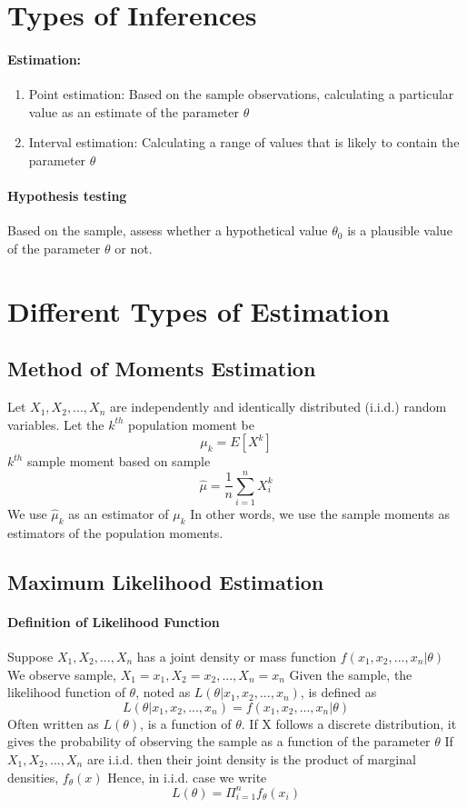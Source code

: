 \documentclass[11pt]{article}
\begin{document}
\section{Types of Inferences}
\paragraph{Estimation:}
\begin{enumerate}
	\item Point estimation: Based on the sample observations, calculating a particular value as an estimate of the parameter $\theta$
	\item Interval estimation: Calculating a range of values that is likely to contain the parameter $\theta$
\end{enumerate}
\paragraph{Hypothesis testing} Based on the sample, assess whether a hypothetical value $\theta_0$ is a plausible value of the parameter $\theta$ or not.
\section{Different Types of Estimation}
\subsection{Method of Moments Estimation}
Let $X_1, X_2, ..., X_n$ are independently and identically distributed (i.i.d.) random variables. \newline
Let the $k^{th}$ population moment be
$$\mu_k = E[X^k]$$
$k^{th}$ sample moment based on sample
$$\hat{\mu} = \frac{1}{n}\sum_{i=1}^{n}X^k_i$$
We use $\hat{\mu}_k$ as an estimator of $\mu_k$ \newline
In other words, we use the sample moments as estimators of the population moments.
\subsection{Maximum Likelihood Estimation}
\paragraph{Definition of Likelihood Function}
Suppose $X_1, X_2,...,X_n$ has a joint density or mass function $f(x_1, x_2,...,x_n|\theta)$ \newline
We observe sample, $X_1 = x_1, X_2 = x_2, ..., X_n = x_n$ \newline
Given the sample, the likelihood function of $\theta$, noted as $L(\theta|x_1, x_2,...,x_n)$, is defined as
$$L(\theta|x_1, x_2,...,x_n) = f(x_1, x_2,...,x_n|\theta)$$
Often written as $L(\theta)$, is a function of $\theta$. \newline
If X follows a discrete distribution, it gives the probability of observing the sample as a function of the parameter $\theta$ \newline
If $X_1, X_2,...,X_n$ are i.i.d. then their joint density is the product of marginal densities, $f_\theta(x)$\newline
Hence, in i.i.d. case we write
$$L(\theta) = \Pi_{i=1}^n f_\theta(x_i)$$
\end{document}
